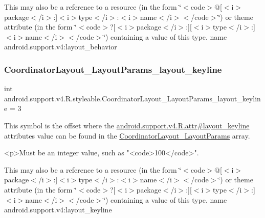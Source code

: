This may also be a reference to a resource (in the form \char`\"{}$<$code$>$@\mbox{[}$<$i$>$package$<$/i$>$\+:\mbox{]}$<$i$>$type$<$/i$>$\+:$<$i$>$name$<$/i$>$$<$/code$>$\char`\"{}) or theme attribute (in the form \char`\"{}$<$code$>$?\mbox{[}$<$i$>$package$<$/i$>$\+:\mbox{]}\mbox{[}$<$i$>$type$<$/i$>$\+:\mbox{]}$<$i$>$name$<$/i$>$$<$/code$>$\char`\"{}) containing a value of this type.  name android.\+support.\+v4\+:layout\+\_\+behavior \mbox{\label{classandroid_1_1support_1_1v4_1_1R_1_1styleable_a13e230146baaab7d1d0d6379b87fbef8}} 
\subsubsection{\texorpdfstring{Coordinator\+Layout\+\_\+\+Layout\+Params\+\_\+layout\+\_\+keyline}{CoordinatorLayout\_LayoutParams\_layout\_keyline}}
{\footnotesize\ttfamily int android.\+support.\+v4.\+R.\+styleable.\+Coordinator\+Layout\+\_\+\+Layout\+Params\+\_\+layout\+\_\+keyline = 3\hspace{0.3cm}{\ttfamily [static]}}

This symbol is the offset where the \hyperlink{classandroid_1_1support_1_1v4_1_1R_1_1attr_aa53f79e9969f32f33d11ad397f0b687b}{android.\+support.\+v4.\+R.\+attr\#layout\+\_\+keyline} attribute\textquotesingle{}s value can be found in the \hyperlink{classandroid_1_1support_1_1v4_1_1R_1_1styleable_a9b9df68895be97c43703c5d0a130e2d9}{Coordinator\+Layout\+\_\+\+Layout\+Params} array.

\begin{DoxyVerb}      <p>Must be an integer value, such as "<code>100</code>".
\end{DoxyVerb}
 

This may also be a reference to a resource (in the form \char`\"{}$<$code$>$@\mbox{[}$<$i$>$package$<$/i$>$\+:\mbox{]}$<$i$>$type$<$/i$>$\+:$<$i$>$name$<$/i$>$$<$/code$>$\char`\"{}) or theme attribute (in the form \char`\"{}$<$code$>$?\mbox{[}$<$i$>$package$<$/i$>$\+:\mbox{]}\mbox{[}$<$i$>$type$<$/i$>$\+:\mbox{]}$<$i$>$name$<$/i$>$$<$/code$>$\char`\"{}) containing a value of this type.  name android.\+support.\+v4\+:layout\+\_\+keyline \mbox{\label{classandroid_1_1support_1_1v4_1_1R_1_1styleable_aaae28c830112a89e52658afe0c8b24dc}} 
